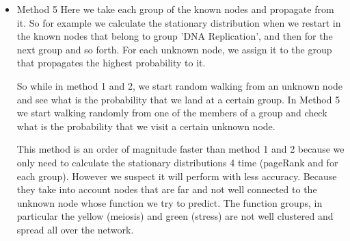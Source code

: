 \documentclass[a4paper,10pt]{article}
\theoremstyle{definition}
\theoremstyle{remark}
\theoremstyle{plain}
\begin{document}
\begin{itemize}
\item{Method 5} Here we take each group of the known nodes and propagate from
it. So for example we calculate the stationary distribution when we restart in
the known nodes that belong to group 'DNA Replication', and then for the next
group and so forth. For each unknown node, we assign it to the group that
propagates the highest probability to it.

So while in method 1 and 2, we start random walking from an unknown node and see
what is the probability that we land at a certain group. In Method 5 we start
walking randomly from one of the members of a group and check what is the
probability that we visit a certain unknown node.

This method is an order of magnitude faster than method 1 and 2 because we only
need to calculate the stationary distributions 4 time (pageRank and for each
group). However we suspect it will perform with less accuracy.
Because they take into account nodes that are far and not well connected to the
unknown node whose function we try to predict.
The function groups, in particular the yellow (meiosis) and green (stress) are not
well clustered and spread all over the network.

\end{itemize}
\end{document}
